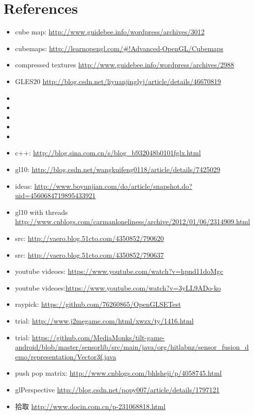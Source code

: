 \documentclass[9pt,b5paper]{article}
\begin{document}
\section{References}
\label{sec-2}
\begin{itemize}
\item cube map: \url{http://www.guidebee.info/wordpress/archives/3012}
\item cubemaps: \url{http://learnopengl.com/#!Advanced-OpenGL/Cubemaps}
\item compressed textures \url{http://www.guidebee.info/wordpress/archives/2988}
\item GLES20 \url{http://blog.csdn.net/liyuanjinglyj/article/details/46670819}
\item 
\item 
\item 
\item 
\item 
\item c++: \url{http://blog.sina.com.cn/s/blog_b932048b0101fglx.html}
\item gl10: \url{http://blog.csdn.net/wangkuifeng0118/article/details/7425029}
\item ideas: \url{http://www.boyunjian.com/do/article/snapshot.do?uid=4560684719895433921}
\item gl10 with threads \url{http://www.cnblogs.com/carmanloneliness/archive/2012/01/06/2314909.html}
\item src: \url{http://vaero.blog.51cto.com/4350852/790620}
\item src: \url{http://vaero.blog.51cto.com/4350852/790637}
\item youtube videoes: \url{https://www.youtube.com/watch?v=hpnd11doMgc}
\item youtube videoes:\url{https://www.youtube.com/watch?v=3yLL9ADo-ko}
\item raypick: \url{https://github.com/76260865/OpenGLSETest}
\item trial: \url{http://www.j2megame.com/html/xwzx/ty/1416.html}
\item trial: \url{https://github.com/MediaMonks/tilt-game-android/blob/master/sensorlib/src/main/java/org/hitlabnz/sensor_fusion_demo/representation/Vector3f.java}
\item push pop matrix: \url{http://www.cnblogs.com/bhlsheji/p/4058745.html}
\item glPerspective \url{http://blog.csdn.net/popy007/article/details/1797121}
\item 拾取 \url{http://www.docin.com.cn/p-231068818.html}

\end{itemize}
\end{document}

